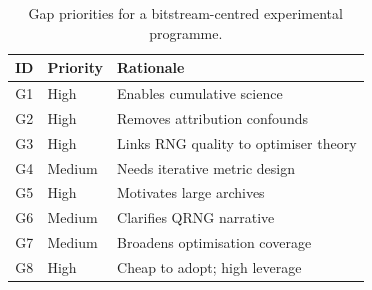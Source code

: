 \begin{table}[t]
\centering
\caption{Gap priorities for a bitstream-centred experimental programme.}
\label{tab:gap-priority}
\begin{tabular}{@{}clp{7.5cm}@{}}
\toprule
\textbf{ID} & \textbf{Priority} & \textbf{Rationale} \\
\midrule
G1 & High & Enables cumulative science \\
G2 & High & Removes attribution confounds \\
G3 & High & Links RNG quality to optimiser theory \\
G4 & Medium & Needs iterative metric design \\
G5 & High & Motivates large archives \\
G6 & Medium & Clarifies QRNG narrative \\
G7 & Medium & Broadens optimisation coverage \\
G8 & High & Cheap to adopt; high leverage \\
\bottomrule
\end{tabular}
\end{table}
